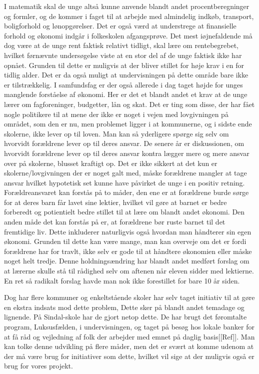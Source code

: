 I matematik skal de unge altså kunne anvende blandt andet procentberegninger og formler, og de kommer i faget til at arbejde med almindelig indkøb, transport, boligforhold og lønopgørelser. Det er også værd at understrege at finansielle forhold og økonomi indgår i folkeskolen afgangsprøve. Det mest iøjnefaldende må dog være at de unge rent faktisk relativt tidligt, skal lære om rentebegrebet, hvilket førnævnte undersøgelse viste at en stor del af de unge faktisk ikke har opnået. Grunden til dette er muligvis at der bliver stillet for høje krav i en for tidlig alder. Det er da også muligt at undervisningen på dette område bare ikke er tilstrækkelig.
I samfundsfag er der også allerede i dag taget højde for unges manglende forståelse af økonomi. Her er det et blandt andet et krav at de unge lærer om fagforeninger, budgetter, lån og skat. Det er ting som disse, der har fået nogle politikere til at mene der ikke er noget i vejen med lovgivningen på området, som den er nu, men problemet ligger i at kommunerne, og i sidste ende skolerne, ikke lever op til loven\cite{BusinessDK3}. Man kan så yderligere spørge sig selv om hvorvidt forældrene lever op til deres ansvar. De senere år er diskussionen, om hvorvidt forældrene lever op til deres ansvar kontra lægger mere og mere ansvar over på skolerne, blusset kraftigt op. Det er ikke sikkert at det kun er skolerne/lovgivningen der er noget galt med, måske forældrene mangler at tage ansvar hvilket hypotetisk set kunne have påvirket de unge i en positiv retning. Forældreansvaret kan forstås på to måder, den ene er at forældrene burde sørge for at deres barn får lavet sine lektier, hvilket vil gøre at barnet er bedre forberedt og potientielt bedre stillet til at lære om blandt andet økonomi. Den anden måde det kan forstås på er, at forældrene bør ruste barnet til det fremtidige liv. Dette inkluderer naturligvis også hvordan man håndterer sin egen økonomi. Grunden til dette kan være mange, man kan overveje om det er fordi forældrene har for travlt, ikke selv er gode til at håndtere økonomien eller måske noget helt tredje. Denne holdningsændring har blandt andet medført forslag om at lærerne skulle stå til rådighed selv om aftenen når eleven sidder med lektierne. En ret så radikalt forslag havde man nok ikke forestillet for bare 10 år siden\cite{ForaldreAnsvar}.

Dog har flere kommuner og enkeltstående skoler har selv taget initiativ til at gøre en ekstra indsats mod dette problem, Dette sker på blandt andet temadage og lignende. På Sindal-skole har de gjort netop dette. De har brugt det føromtalte program, Luksusfælden, i undervisningen, og taget på besøg hos lokale banker for at få råd og vejledning af folk der arbejder med emnet på daglig basis[[Ref]]. Man kan tolke denne udvikling på flere måder, men det er svært at komme udenom at der må være brug for initiativer som dette, hvilket vil sige at der muligvis også er brug for vores projekt.






 